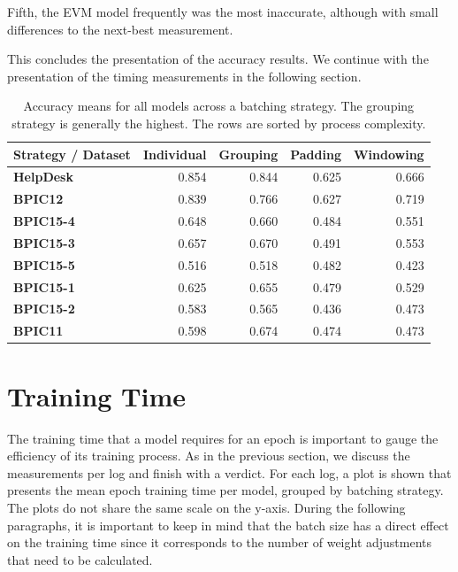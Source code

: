 Fifth, the EVM model frequently was the most inaccurate, although with small differences to the next-best measurement.

This concludes the presentation of the accuracy results.
We continue with the presentation of the timing measurements in the following section.

\begin{table}
\centering
\begin{tabular}{p{3cm}rrrr}
\textbf{Strategy / Dataset}  &  \textbf{Individual} &  \textbf{Grouping} &   \textbf{Padding} &  \textbf{Windowing}\\
\midrule
\textbf{HelpDesk} &       0.854 &    0.844 &   0.625 &     0.666 \\
\textbf{BPIC12  } &       0.839 &    0.766 &   0.627 &     0.719 \\
\textbf{BPIC15-4} &       0.648 &    0.660 &   0.484 &     0.551 \\
\textbf{BPIC15-3} &       0.657 &    0.670 &   0.491 &     0.553 \\
\textbf{BPIC15-5} &       0.516 &    0.518 &   0.482 &     0.423 \\
\textbf{BPIC15-1} &       0.625 &    0.655 &   0.479 &     0.529 \\
\textbf{BPIC15-2} &       0.583 &    0.565 &   0.436 &     0.473 \\
\textbf{BPIC11  } &       0.598 &    0.674 &   0.474 &     0.473 \\
\end{tabular}
\caption[Mean accuracies per batching strategy]{Accuracy means for all models across a batching strategy. The grouping strategy is generally the highest. The rows are sorted by process complexity.}
\label{tab:strategy-top-accuracies}
\end{table}


\section{Training Time}\label{sec:eval:training-time}
The training time that a model requires for an epoch is important to gauge the efficiency of its training process.
As in the previous section, we discuss the measurements per log and finish with a verdict.
For each log, a plot is shown that presents the mean epoch training time per model, grouped by batching strategy.
The plots do not share the same scale on the y-axis.
During the following paragraphs, it is important to keep in mind that the batch size has a direct effect on the training time since it corresponds to the number of weight adjustments that need to be calculated.

